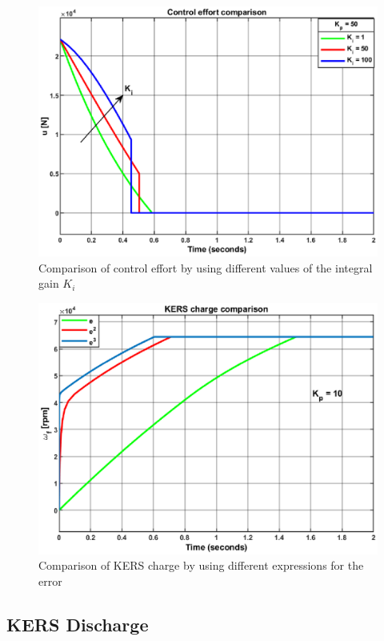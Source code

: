 \documentclass[11pt]{article}
\begin{document}
\begin{figure}[H]
\centering
\includegraphics[width=.6\textwidth]{Images/Results_Dynamics/Charge_comparison/control_effort_charge_comp_IntGain.eps}
\caption{Comparison of control effort by using different values of the integral gain $K_i$}
\label{fig: Comparison_Control_Effort_PI}
\end{figure}

\begin{figure}[H]
\centering
\includegraphics[width=.6\textwidth]{Images/Results_Dynamics/Charge_comparison/kers_charge_comp_controller.eps}
\caption{Comparison of KERS charge by using different expressions for the error}
\label{fig: Comparison_KERS_charge_error}
\end{figure}

\subsection{KERS Discharge}
\end{document}
